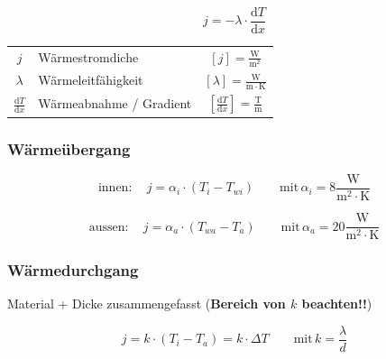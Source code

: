 $$ \boxed{ j = - \lambda \cdot \frac{\mathrm{d} T}{\mathrm{d} x}  } $$ 


\begin{tabular}{c l c}
	\rule{0pt}{10pt}$j$ & Wärmestromdiche & $[j] = \mathrm{\frac{W}{m^2}}$ \\
	\rule{0pt}{10pt}$\lambda$ & Wärmeleitfähigkeit & $[\lambda] = \mathrm{\frac{W}{m \cdot K}} $\\
	\rule{0pt}{10pt}$\frac{\mathrm{d} T}{\mathrm{d} x}$ & Wärmeabnahme / Gradient & $ [\frac{\mathrm{d} T}{\mathrm{d} x}] = \mathrm{\frac{T}{m}}$ \\
\end{tabular}


\subsubsection{Wärmeübergang}

$$ \boxed{\mathrm{innen:} \quad  j = \alpha_i \cdot (T_i - T_{wi} )  \qquad \mathrm{mit} \, \alpha_i = 8 \mathrm{\frac{W}{m^2 \cdot K}}  }  $$ 

$$ \boxed{\mathrm{aussen:} \quad  j = \alpha_a \cdot (T_{wa} - T_a )  \qquad \mathrm{mit} \, \alpha_a = 20 \mathrm{\frac{W}{m^2 \cdot K}}  }  $$ 





\subsubsection{Wärmedurchgang}
Material + Dicke zusammengefasst (\textbf{Bereich von $k$ beachten!!})

$$ \boxed{ j = k \cdot (T_i - T_a) = k \cdot \Delta T  \qquad \mathrm{mit} \, k = \frac{\lambda}{d} }  $$ 




